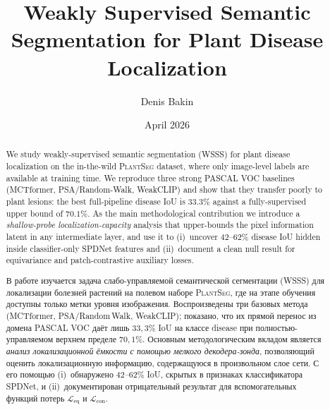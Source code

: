 \documentclass[11pt,a4paper]{article}
\title{Weakly Supervised Semantic Segmentation for Plant Disease Localization}
\author{Denis Bakin}
\date{April 2026}
\newcommand{\Leq}{\mathcal{L}_{\mathrm{eq}}}
\newcommand{\Lcon}{\mathcal{L}_{\mathrm{con}}}
\begin{document}
% 

\begin{abstract}
\noindent
We study weakly-supervised semantic segmentation (WSSS) for plant disease
localization on the in-the-wild \textsc{PlantSeg} dataset, where only
image-level labels are available at training time. We reproduce three
strong PASCAL VOC baselines (MCTformer, PSA/Random-Walk, WeakCLIP) and
show that they transfer poorly to plant lesions: the best full-pipeline
disease IoU is $33.3\%$ against a fully-supervised upper bound of
$70.1\%$. As the main methodological contribution we introduce a
\emph{shallow-probe localization-capacity} analysis that upper-bounds the
pixel information latent in any intermediate layer, and use it to (i)~uncover
$42$--$62\%$ disease IoU hidden inside classifier-only SPDNet features and
(ii)~document a clean null result for equivariance and patch-contrastive
auxiliary losses.
\end{abstract}

\vspace{0.5em}

\begin{otherlanguage}{russian}
\begin{abstract}
\noindent
В работе изучается задача слабо-управляемой семантической сегментации
(WSSS) для локализации болезней растений на полевом наборе
\textsc{PlantSeg}, где на этапе обучения доступны только метки уровня
изображения. Воспроизведены три базовых метода (MCTformer,
PSA/Random\,Walk, WeakCLIP); показано, что их прямой перенос из домена
PASCAL VOC даёт лишь $33{,}3\%$ IoU на классе disease при
полностью-управляемом верхнем пределе $70{,}1\%$. Основным
методологическим вкладом является \emph{анализ локализационной ёмкости
с помощью мелкого декодера-зонда}, позволяющий оценить локализационную
информацию, содержащуюся в произвольном слое сети. С его помощью
(i)~обнаружено $42$--$62\%$ IoU, скрытых в признаках классификатора
SPDNet, и (ii)~документирован отрицательный результат для
вспомогательных функций потерь $\Leq$ и $\Lcon$.
\end{abstract}
\end{otherlanguage}
\end{document}
